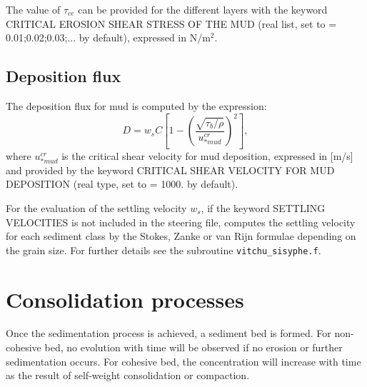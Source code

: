 The value of $\tau_{ce}$ can be provided for the different layers with the keyword {\ttfamily CRITICAL EROSION SHEAR STRESS OF THE MUD} (real list, set to {\ttfamily = 0.01;0.02;0.03;...} by default), expressed in N/m$^2$.

\subsection{Deposition flux}
The deposition flux for mud is computed by the expression:
\begin{equation}
D = w_{s} C \left[1-\left(\frac{\sqrt{\tau_b/\rho}}{u_{*mud}^{cr}}\right)^2 \right],
\end{equation}
where $u_{*mud}^{cr}$ is the critical shear velocity for mud deposition, expressed in [m/s] and provided by the keyword {\ttfamily CRITICAL SHEAR VELOCITY FOR MUD DEPOSITION} (real type, set to {\ttfamily = 1000.} by default).

For the evaluation of the settling velocity $w_s $, if the keyword {\ttfamily SETTLING VELOCITIES} is not included in the steering file, \sisyphe{} computes the settling velocity for each sediment class by the Stokes, Zanke or van Rijn formulae depending on the grain size. For further details see the subroutine \texttt{vitchu\_sisyphe.f}.

\section{Consolidation processes}
Once the sedimentation process is achieved, a sediment bed is formed. For
non-cohesive bed, no evolution with time will be observed if no erosion or
further sedimentation occurs. For cohesive bed, the concentration will
increase with time as the result of self-weight consolidation or compaction.


